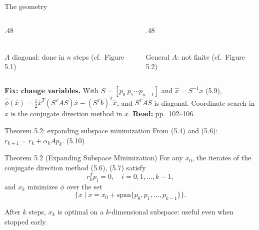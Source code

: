 \documentclass[12pt,aspectratio=169]{beamer}
\newcommand{\readpp}[1]{{\color{red!80!black}\textbf{Read:} #1}}
\begin{document}
\begin{frame}{The geometry}
  \begin{columns}[c]
    \begin{column}{.48\textwidth}
      \centering
      \\
      $A$ diagonal: done in $n$ steps (cf.\ Figure 5.1)
    \end{column}
    \begin{column}{.48\textwidth}
      \centering
      \\
      General $A$: not finite (cf.\ Figure 5.2)
    \end{column}
  \end{columns}
  \vspace{1ex}
  \textbf{Fix: change variables.} With $S=[p_0\ p_1\cdots p_{n-1}]$ and $\hat x=S^{-1}x$ (5.9),
  $\hat\phi(\hat x)=\tfrac12\hat x^T(S^TAS)\hat x-(S^Tb)^T\hat x$, and $S^TAS$ is diagonal.
  Coordinate search in $\hat x$ is the conjugate direction method in $x$.
  \readpp{pp.~102--106.}
\end{frame}

\begin{frame}{Theorem 5.2: expanding subspace minimization}
  From (5.4) and (5.6): \ $r_{k+1} = r_k+\alpha_kAp_k$. \hfill (5.10)
  \begin{block}{Theorem 5.2 (Expanding Subspace Minimization)}
    For any $x_0$, the iterates of the conjugate direction method (5.6), (5.7) satisfy
    \begin{equation}
      r_k^Tp_i = 0, \quad i=0,1,\dots,k-1, \tag{5.11}
    \end{equation}
    and $x_k$ minimizes $\phi$ over the set
    \begin{equation}
      \{x \mid x=x_0+\mathrm{span}\{p_0,p_1,\dots,p_{k-1}\}\}. \tag{5.12}
    \end{equation}
  \end{block}
  After $k$ steps, $x_k$ is \alert{optimal on a $k$-dimensional subspace}: useful even when stopped early.
\end{frame}
\end{document}
